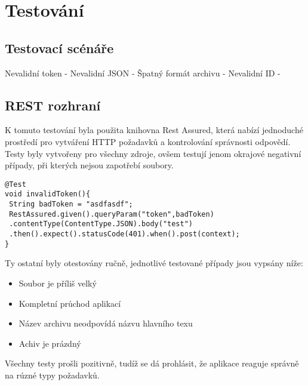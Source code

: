 \chapter{Testování}  


\section{Testovací scénáře}
Nevalidní token - 
Nevalidní JSON -
Špatný formát archivu -
Nevalidní ID -  

\section{REST rozhraní}
K tomuto testování byla použita knihovna Rest Assured, která nabízí jednoduché prostředí pro vytváření HTTP požadavků a kontrolování správnosti odpovědí. Testy byly vytvořeny pro všechny zdroje, ovšem testují jenom okrajové negativní případy, při kterých nejsou zapotřebí soubory. 

\begin{lstlisting}[caption=Požadavek se špatným tokenem]
@Test
void invalidToken(){
 String badToken = "asdfasdf";
 RestAssured.given().queryParam("token",badToken)
 .contentType(ContentType.JSON).body("test")
 .then().expect().statusCode(401).when().post(context);
}
\end{lstlisting} 

Ty ostatní byly otestovány ručně, jednotlivé testované případy jsou vypsány níže:
\begin{itemize}
	\item Soubor je příliš velký
	\item Kompletní průchod aplikací
	\item Název archivu neodpovídá názvu hlavního texu
	\item Achiv je prázdný
\end{itemize}

Všechny testy prošli pozitivně, tudíž se dá prohlásit, že aplikace reaguje správně na rúzné typy požadavků. 

\section{} 

